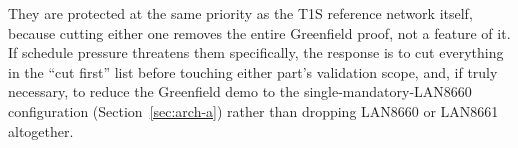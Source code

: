 \begin{decision}[title={LAN8660 and LAN8661 are explicitly not on the cut list}]
They are protected at the same priority as the T1S reference network itself, because cutting either one removes the entire Greenfield proof, not a feature of it. If schedule pressure threatens them specifically, the response is to cut everything in the ``cut first'' list before touching either part's validation scope, and, if truly necessary, to reduce the Greenfield demo to the single-mandatory-LAN8660 configuration (Section~\ref{sec:arch-a}) rather than dropping LAN8660 or LAN8661 altogether.
\end{decision}
